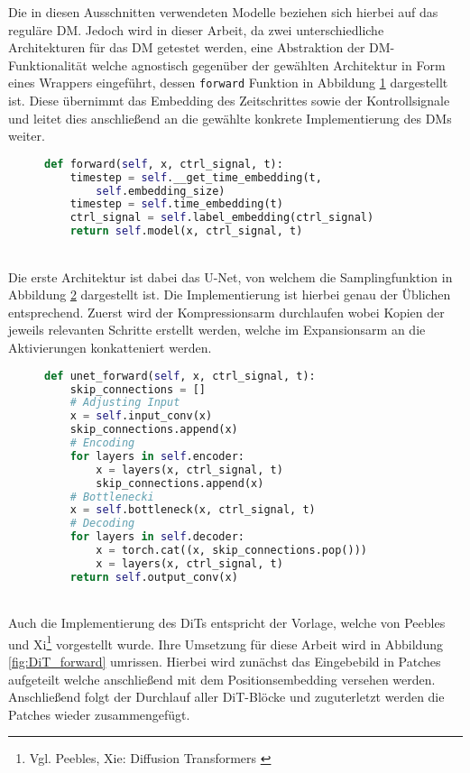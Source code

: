 Die in diesen Ausschnitten verwendeten Modelle beziehen sich hierbei auf das reguläre DM. Jedoch wird in dieser Arbeit, da zwei unterschiedliche Architekturen für das DM getestet werden, eine Abstraktion der DM-Funktionalität welche agnostisch gegenüber der gewählten Architektur in Form eines Wrappers eingeführt, dessen \texttt{forward} Funktion in Abbildung \ref{fig:DM_forward} dargestellt ist. Diese übernimmt das Embedding des Zeitschrittes sowie der Kontrollsignale und leitet dies anschließend an die gewählte konkrete Implementierung des DMs weiter. 
\begin{figure}[htbp]
\begin{lstlisting}[language=python]
def forward(self, x, ctrl_signal, t):
    timestep = self.__get_time_embedding(t, 
        self.embedding_size)
    timestep = self.time_embedding(t)
    ctrl_signal = self.label_embedding(ctrl_signal)
    return self.model(x, ctrl_signal, t)
\end{lstlisting}
    \captionsetup{type=figure}
    \label{fig:DM_forward}
\end{figure} \\
Die erste Architektur ist dabei das U-Net, von welchem die Samplingfunktion in Abbildung \ref{fig:UNET_forward} dargestellt ist. Die Implementierung ist hierbei genau der Üblichen entsprechend. Zuerst wird der Kompressionsarm durchlaufen wobei Kopien der jeweils relevanten Schritte erstellt werden, welche im Expansionsarm an die Aktivierungen konkatteniert werden.  
\begin{figure}[htbp]
\begin{lstlisting}[language=python]
def unet_forward(self, x, ctrl_signal, t):
    skip_connections = []
    # Adjusting Input
    x = self.input_conv(x)
    skip_connections.append(x)
    # Encoding
    for layers in self.encoder:
        x = layers(x, ctrl_signal, t)
        skip_connections.append(x)
    # Bottlenecki
    x = self.bottleneck(x, ctrl_signal, t)
    # Decoding
    for layers in self.decoder:
        x = torch.cat((x, skip_connections.pop())) 
        x = layers(x, ctrl_signal, t)
    return self.output_conv(x)
\end{lstlisting}
    \captionsetup{type=figure}
    \label{fig:UNET_forward}
\end{figure} \\
Auch die Implementierung des DiTs entspricht der Vorlage, welche von Peebles und Xi\footnote{
    Vgl. Peebles, Xie: Diffusion Transformers
    \cite{peebles2023scalable}
} vorgestellt wurde. Ihre Umsetzung für diese Arbeit wird in Abbildung \ref{fig:DiT_forward} umrissen. Hierbei wird zunächst das Eingebebild in Patches aufgeteilt welche anschließend mit dem Positionsembedding versehen werden. Anschließend folgt der Durchlauf aller DiT-Blöcke und zuguterletzt werden die Patches wieder zusammengefügt. 
